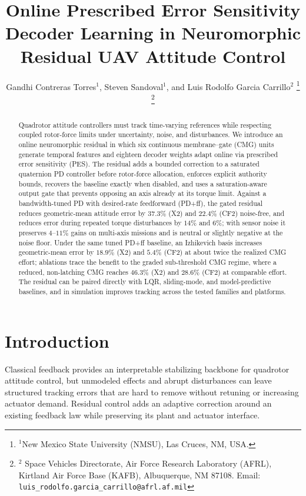 \documentclass[letterpaper, 10 pt, conference]{ieeeconf}
\title{\LARGE \bf Online Prescribed Error Sensitivity Decoder Learning in Neuromorphic Residual UAV Attitude Control}
\author{Gandhi Contreras Torres$^{1}$, Steven Sandoval$^{1}$, and Luis Rodolfo Garcia Carrillo$^{2}$%
\thanks{$^{1}$New Mexico State University (NMSU), Las Cruces, NM, USA.}%
\thanks{$^{2}$ Space Vehicles Directorate, Air Force Research Laboratory (AFRL), Kirtland Air Force Base (KAFB), Albuquerque, NM 87108.
    Email: {\tt\small luis\_rodolfo.garcia\_carrillo@afrl.af.mil}}%
}
\begin{document}
\maketitle



\begin{abstract}
Quadrotor attitude controllers must track time-varying references while respecting coupled rotor-force limits under uncertainty, noise, and disturbances. We introduce an online neuromorphic residual in which six continuous membrane--gate (CMG) units generate temporal features and eighteen decoder weights adapt online via prescribed error sensitivity (PES).
The residual adds a bounded correction to a saturated quaternion PD controller before rotor-force allocation, enforces explicit authority bounds, recovers the baseline exactly when disabled, and uses a saturation-aware output gate that prevents opposing an axis already at its torque limit.
Against a bandwidth-tuned PD with desired-rate feedforward (PD+ff), the gated residual reduces geometric-mean attitude error by $37.3\%$ (X2) and $22.4\%$ (CF2) noise-free, and reduces error during repeated torque disturbances by $14\%$ and $6\%$; with sensor noise it preserves $4$--$11\%$ gains on multi-axis missions and is neutral or slightly negative at the noise floor.
Under the same tuned PD+ff baseline, an Izhikevich basis increases geometric-mean error by $18.9\%$ (X2) and $5.4\%$ (CF2) at about twice the realized CMG effort; ablations trace the benefit to the graded sub-threshold CMG regime, where a reduced, non-latching CMG reaches $46.3\%$ (X2) and $28.6\%$ (CF2) at comparable effort.
The residual can be paired directly with LQR, sliding-mode, and model-predictive baselines, and in simulation improves tracking across the tested families and platforms.
\end{abstract}


\section{Introduction}
Classical feedback provides an interpretable stabilizing backbone for quadrotor attitude control, but unmodeled effects and abrupt disturbances can leave structured tracking errors that are hard to remove without retuning or increasing actuator demand. Residual control adds an adaptive correction around an existing feedback law while preserving its plant and actuator interface.
\end{document}
